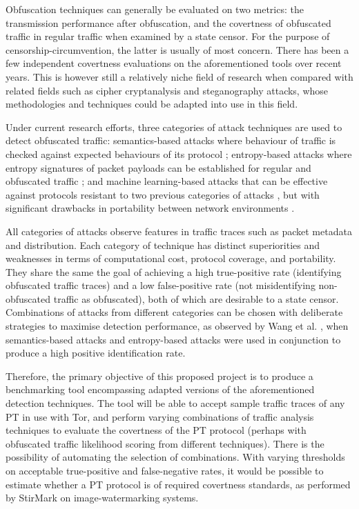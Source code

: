 \documentclass[11pt]{article}
\begin{document}
Obfuscation techniques can generally be evaluated on two metrics: the transmission performance after obfuscation, and the covertness of obfuscated traffic in regular traffic when examined by a state censor. For the purpose of censorship-circumvention, the latter is usually of most concern. There has been a few independent covertness evaluations on the aforementioned tools \cite{tan2015towards} \cite{houmansadr2013parrot} \cite{wang2015seeing} over recent years. This is however still a relatively niche field of research when compared with related fields such as cipher cryptanalysis and steganography attacks, whose methodologies and techniques could be adapted into use in this field.

Under current research efforts, three categories of attack techniques are used to detect obfuscated traffic: semantics-based attacks where behaviour of traffic is checked against expected behaviours of its protocol \cite[Sec. VIII]{houmansadr2013parrot} \cite[Sec. 4]{wang2015seeing}; entropy-based attacks where entropy signatures of packet payloads can be established for regular and obfuscated traffic \cite{tan2015towards} \cite[Sec. 5]{wang2015seeing}; and machine learning-based attacks that can be effective against protocols resistant to two previous categories of attacks \cite[Sec. 6]{wang2015seeing}, but with significant drawbacks in portability between network environments \cite{dixon2016network}. 

All categories of attacks observe features in traffic traces such as packet metadata and distribution. Each category of technique has distinct superiorities and weaknesses in terms of computational cost, protocol coverage, and portability. They share the same the goal of achieving a high true-positive rate (identifying obfuscated traffic traces) and a low false-positive rate (not misidentifying non-obfuscated traffic as obfuscated), both of which are desirable to a state censor. Combinations of attacks from different categories can be chosen with deliberate strategies to maximise detection performance, as observed by Wang et al. \cite[Sec. 5.2]{wang2015seeing}, when semantics-based attacks and entropy-based attacks were used in conjunction to produce a high positive identification rate.

Therefore, the primary objective of this proposed project is to produce a benchmarking tool encompassing adapted versions of the aforementioned detection techniques. The tool will be able to accept sample traffic traces of any PT in use with Tor, and perform varying combinations of traffic analysis techniques to evaluate the covertness of the PT protocol (perhaps with obfuscated traffic likelihood scoring from different techniques). There is the possibility of automating the selection of combinations. With varying thresholds on acceptable true-positive and false-negative rates, it would be possible to estimate whether a PT protocol is of required covertness standards, as performed by StirMark \cite{petitcolas1998attacks} on image-watermarking systems.
\end{document}
